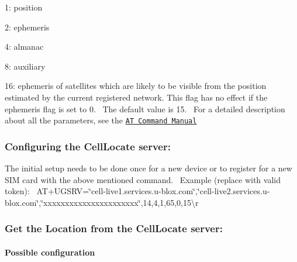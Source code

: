 \begin{DoxyItemize}
\begin{DoxyItemize}
\item 1\+: position~\newline

\item 2\+: ephemeris~\newline

\item 4\+: almanac~\newline

\item 8\+: auxiliary~\newline

\item 16\+: ephemeris of satellites which are likely to be visible from the position estimated by the current registered network. This flag has no effect if the ephemeris flag is set to 0.~\newline
 The default value is 15.~\newline
 For a detailed description about all the parameters, see the \href{https://www.u-blox.com/en/docs/UBX-13002752}{\tt AT Command Manual}
\end{DoxyItemize}
\end{DoxyItemize}

\subsubsection*{Configuring the Cell\+Locate server\+:}

The initial setup needs to be done once for a new device or to register for a new S\+IM card with the above mentioned command.~\newline
 Example (replace with valid token)\+:~\newline
 {\ttfamily A\+T+\+U\+G\+S\+RV=\char`\"{}cell-\/live1.\+services.\+u-\/blox.\+com\char`\"{},\char`\"{}cell-\/live2.\+services.\+u-\/blox.\+com\char`\"{},\char`\"{}xxxxxxxxxxxxxxxxxxxxxx\char`\"{},14,4,1,65,0,15\textbackslash{}r}

\subsubsection*{Get the Location from the Cell\+Locate server\+:}

\paragraph*{Possible configuration}

